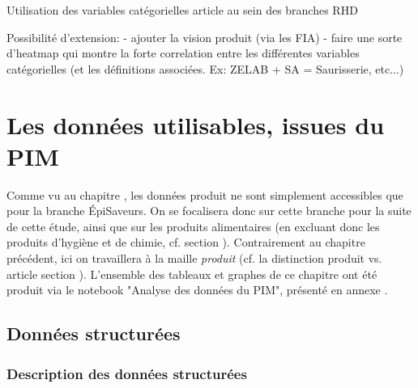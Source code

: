             \begin{table}[htbp]
                \footnotesize
                \begin{center}
                
                \vspace{5pt}
                
                \vspace{5pt}
                
                \vspace{5pt}
                
                \end{center}
                \caption{Utilisation des variables catégorielles article au sein des branches RHD}
                \label{tab:repart_art_categ}
                \normalsize
            \end{table}

            Possibilité d'extension: 
            - ajouter la vision produit (via les FIA)
            - faire une sorte d'heatmap qui montre la forte correlation entre les différentes variables catégorielles (et les définitions associées. Ex: ZELAB + SA = Saurisserie, etc...)

    \chapter{Les données utilisables, issues du PIM}
        \large
        Comme vu au chapitre , les données produit ne sont simplement accessibles que pour la branche \'{E}piSaveurs.
        On se focalisera donc sur cette branche pour la suite de cette étude, ainsi que sur les produits alimentaires (en excluant donc les produits d'hygiène et de chimie, cf. section ).
        Contrairement au chapitre précédent, ici on travaillera à la maille \emph{produit} (cf. la distinction produit vs. article section ).
        L'ensemble des tableaux et graphes de ce chapitre ont été produit via le notebook "Analyse des données du PIM", présenté en annexe .
        \normalsize

        \section{Données structurées}

            \subsection{Description des données structurées}

